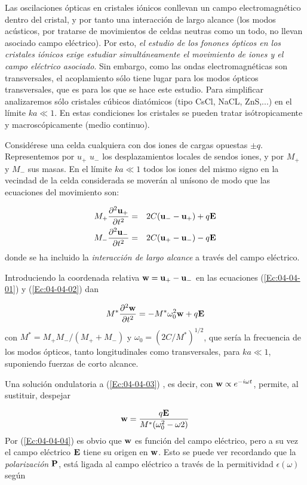 Las oscilaciones ópticas en cristales iónicos conllevan un campo electromagnético dentro del cristal, y por tanto una interacción de largo alcance (los modos acústicos, por tratarse de movimientos de celdas neutras como un todo, no llevan asociado campo eléctrico). Por esto, \textit{el estudio de los fonones ópticos en los cristales iónicos exige estudiar simultáneamente el movimiento de iones y el campo eléctrico asociado}. Sin embargo, como las ondas electromagnéticas son transversales, el acoplamiento sólo tiene lugar para los modos ópticos transversales, que es para los que se hace este estudio. Para simplificar analizaremos sólo cristales cúbicos diatómicos (tipo CsCl, NaCL, ZnS,...) en el límite $ka\ll 1$. En estas condiciones los cristales se pueden tratar isótropicamente y macroscópicamente (medio continuo). 

Considérese una celda cualquiera con dos iones de cargas opuestas $\pm q$. Representemos por $u_+$ $u_-$ los desplazamientos locales de sendos iones, y por $M_+$ y $M_-$ sus masas. En el límite $ka\ll 1$ todos los iones del mismo signo en la vecindad de la celda considerada se moverán al unísono de modo que las ecuaciones del movimiento son:

\begin{eqnarray}
	M_+ \frac{\partial ^2 \mathbf{u}_+}{\partial t^2} & = & 2C(\mathbf{u}_- - \mathbf{u}_+) + q \mathbf{E} \label{Ec:04-04-01}\\
	M_- \frac{\partial ^2 \mathbf{u}_-}{\partial t^2} & = & 2C(\mathbf{u}_+ - \mathbf{u}_-) - q \mathbf{E} \label{Ec:04-04-02}
\end{eqnarray}
donde se ha incluido la \textit{interacción de largo alcance} a través del campo eléctrico. 

Introduciendo la coordenada relativa $\mathbf{w} = \mathbf{u}_+ - \mathbf{u}_-$ en las ecuaciones (\ref{Ec:04-04-01}) y (\ref{Ec:04-04-02}) dan

\begin{equation}
	M^* \frac{\partial ^2 \mathbf{w}}{\partial t^2} = - M^*  \omega_0^2 \mathbf{w} + q \mathbf{E} \label{Ec:04-04-03}
\end{equation}
con $M^*=M_+M_-/(M_++M_-)$ y $\omega_0=(2C/M^*)^{1/2}$, que sería la frecuencia de los modos ópticos, tanto longitudinales como transversales, para $ka\ll 1$, suponiendo fuerzas de corto alcance. 

Una solución ondulatoria a (\ref{Ec:04-04-03}) , es decir, con $\mathbf{w}\propto e^{-i\omega t}$, permite, al sustituir, despejar

\begin{equation}
	\mathbf{w} = \frac{q\mathbf{E}}{M^* (\omega_0^2 - \omega2)}\label{Ec:04-04-04}
\end{equation}
Por (\ref{Ec:04-04-04}) es obvio que $\mathbf{w}$ es función del campo eléctrico, pero a su vez el campo eléctrico $\mathbf{E}$ tiene su origen en $\mathbf{w}$. Esto se puede ver recordando que la \textit{polarización} $\mathbf{P}$, está ligada al campo eléctrico a través de la permitividad $\epsilon (\omega)$ según 

